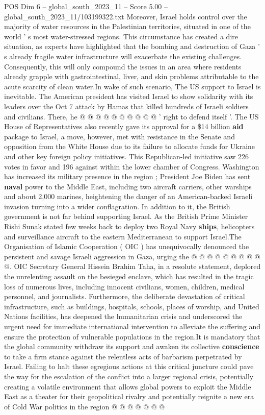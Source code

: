 \begin{textsample}{POS Dim 6 – global\_south\_2023\_11 – Score 5.00 – global\_south\_2023\_11/103199322.txt}
Moreover, Israel holds control over the majority of water resources in the Palestinian territories, situated in one of the world ' s most water-stressed regions.
This circumstance has created a dire situation, as experts have highlighted that the bombing and destruction of Gaza ' s already fragile water infrastructure will exacerbate the existing challenges.
Consequently, this will only compound the issues in an area where residents already grapple with gastrointestinal, liver, and skin problems attributable to the acute scarcity of clean water.In wake of such scenario, The US support to Israel is inevitable.
The American president has visited Israel to show solidarity with its leaders over the Oct 7 attack by Hamas that killed hundreds of Israeli soldiers and civilians.
There, he @ @ @ @ @ @ @ @ @ @ ' right to defend itself '.
The US House of Representatives also recently gave its approval for a \$14 billion \textbf{aid} package to Israel, a move, however, met with resistance in the Senate and opposition from the White House due to its failure to allocate funds for Ukraine and other key foreign policy initiatives.
This Republican-led initiative saw 226 votes in favor and 196 against within the lower chamber of Congress.
Washington has increased its military presence in the region ; President Joe Biden has sent \textbf{naval} power to the Middle East, including two aircraft carriers, other warships and about 2,000 marines, heightening the danger of an American-backed Israeli invasion turning into a wider conflagration.
In addition to it, the British government is not far behind supporting Israel.
As the British Prime Minister Rishi Sunak stated few weeks back to deploy two Royal Navy \textbf{ships}, helicopters and surveillance aircraft to the eastern Mediterranean to support Israel.The Organisation of Islamic Cooperation ( OIC ) has unequivocally denounced the persistent and savage Israeli aggression in Gaza, urging the @ @ @ @ @ @ @ @ @ @.
OIC Secretary General Hissein Brahim Taha, in a resolute statement, deplored the unrelenting assault on the besieged enclave, which has resulted in the tragic loss of numerous lives, including innocent civilians, women, children, medical personnel, and journalists.
Furthermore, the deliberate devastation of critical infrastructure, such as buildings, hospitals, schools, places of worship, and United Nations facilities, has deepened the humanitarian crisis and underscored the urgent need for immediate international intervention to alleviate the suffering and ensure the protection of vulnerable populations in the region.It is mandatory that the global community withdraw its support and awaken its collective \textbf{conscience} to take a firm stance against the relentless acts of barbarism perpetrated by Israel.
Failing to halt these egregious actions at this critical juncture could pave the way for the escalation of the conflict into a larger regional crisis, potentially creating a volatile environment that allows global powers to exploit the Middle East as a theater for their geopolitical rivalry and potentially reignite a new era of Cold War politics in the region @ @ @ @ @ @ @

\end{textsample}
